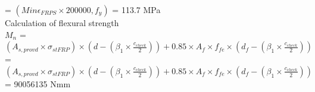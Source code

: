 \documentclass[12pt,a4paper]{article} %
\newcommand{\tab}{\hspace*{2em}} %
\begin{document}
\tab\tab\tab\tab\tab =
$(Min{{\epsilon_{FRPS} \times 200000}, {f_y}})$ = 113.7 MPa \\[8pt]

\tab Calculation of flexural strength \\[8pt]
\tab$M_n$ = $(A_{s,provd} \times \sigma_{stFRP}) \times (d-(\beta_1 \times \frac{c_{check}}{2})) + 0.85 \times A_f \times f_{fe} \times (d_f - (\beta_1 \times \frac{c_{check}}{2} )) $ \\[8pt]

\tab\tab= $(A_{s,provd} \times \sigma_{stFRP}) \times (d-(\beta_1 \times \frac{c_{check}}{2})) + 0.85 \times A_f \times f_{fe} \times (d_f - (\beta_1 \times \frac{c_{check}}{2} )) $  \\[8pt]

\tab\tab= 90056135 Nmm \\[8pt]
















\end{document}
